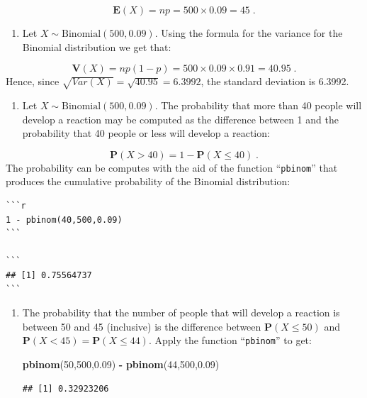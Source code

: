 \documentclass[]{krantz}
\makeatletter
\newenvironment{Shaded}{\begin{snugshade}}{\end{snugshade}}
\newcommand{\DecValTok}[1]{\textcolor[rgb]{0.00,0.00,0.81}{#1}}
\newcommand{\FloatTok}[1]{\textcolor[rgb]{0.00,0.00,0.81}{#1}}
\newcommand{\KeywordTok}[1]{\textcolor[rgb]{0.13,0.29,0.53}{\textbf{#1}}}
\newcommand{\NormalTok}[1]{#1}
\newcommand{\OperatorTok}[1]{\textcolor[rgb]{0.81,0.36,0.00}{\textbf{#1}}}
\newcommand{\StringTok}[1]{\textcolor[rgb]{0.31,0.60,0.02}{#1}}
\providecommand{\tightlist}{%
  \setlength{\itemsep}{0pt}\setlength{\parskip}{0pt}}
\newcommand{\Expec}{\mathbf{E}}
\newcommand{\Prob}{\mathbf{P}}
\newcommand{\Var}{\mathbf{V}}
\newenvironment{kframe}{%
\medskip{}
\setlength{\fboxsep}{.8em}
 \def\at@end@of@kframe{}%
 \ifinner\ifhmode%
  \def\at@end@of@kframe{\end{minipage}}%
  \begin{minipage}{\columnwidth}%
 \fi\fi%
 \def\FrameCommand##1{\hskip\@totalleftmargin \hskip-\fboxsep
 \colorbox{shadecolor}{##1}\hskip-\fboxsep
     \hskip-\linewidth \hskip-\@totalleftmargin \hskip\columnwidth}%
 \MakeFramed {\advance\hsize-\width
   \@totalleftmargin\z@ \linewidth\hsize
   \@setminipage}}%
 {\par\unskip\endMakeFramed%
 \at@end@of@kframe}
\renewenvironment{Shaded}{\begin{kframe}}{\end{kframe}}
\theoremstyle{definition}
\theoremstyle{definition}
\theoremstyle{definition}
\theoremstyle{remark}
\makeatother
\begin{document}
\[\Expec(X) = n p = 500 \times 0.09 = 45\;.\]

\begin{enumerate}
\def\labelenumi{\arabic{enumi}.}
\setcounter{enumi}{1}
\tightlist
\item
  Let
  \(X \sim \mbox{Binomial}(500,0.09)\). Using the formula for the variance
  for the Binomial distribution we get that:
\end{enumerate}

\[\Var(X) = n p(1-p) = 500 \times 0.09\times 0.91 = 40.95\;.\] Hence,
since \(\sqrt{Var(X)} = \sqrt{40.95} = 6.3992\), the standard deviation is
6.3992.

\begin{enumerate}
\def\labelenumi{\arabic{enumi}.}
\setcounter{enumi}{2}
\tightlist
\item
  Let
  \(X \sim \mbox{Binomial}(500,0.09)\). The probability that more than 40
  people will develop a reaction may be computed as the difference between
  1 and the probability that 40 people or less will develop a reaction:
\end{enumerate}

\[\Prob(X > 40) = 1- \Prob(X \leq 40)\;.\] The probability can be
computes with the aid of the function ``\texttt{pbinom}'' that produces the
cumulative probability of the Binomial distribution:

\begin{verbatim}
```r
1 - pbinom(40,500,0.09)
```

```
## [1] 0.75564737
```
\end{verbatim}

\begin{enumerate}
\def\labelenumi{\arabic{enumi}.}
\setcounter{enumi}{3}
\item
  The probability that the number of
  people that will develop a reaction is between 50 and 45 (inclusive) is
  the difference between \(\Prob(X\leq 50)\) and
  \(\Prob(X < 45) = \Prob(X \leq 44)\). Apply the function ``\texttt{pbinom}'' to
  get:

\begin{Shaded}
\begin{Highlighting}[]
\KeywordTok{pbinom}\NormalTok{(}\DecValTok{50}\NormalTok{,}\DecValTok{500}\NormalTok{,}\FloatTok{0.09}\NormalTok{) }\OperatorTok{-}\StringTok{ }\KeywordTok{pbinom}\NormalTok{(}\DecValTok{44}\NormalTok{,}\DecValTok{500}\NormalTok{,}\FloatTok{0.09}\NormalTok{)}
\end{Highlighting}
\end{Shaded}

\begin{verbatim}
## [1] 0.32923206
\end{verbatim}
\end{enumerate}
\end{document}
